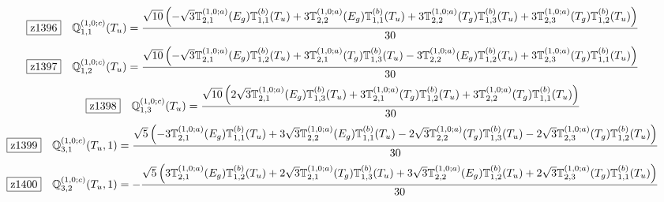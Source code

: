 \documentclass[fleqn,10pt,landscape]{jsarticle}
\begin{document}
\begin{dmath*}
\hspace*{3mm}\fbox{z1396}\quad \mathbb{Q}_{1,1}^{(1,0;c)}(T_{u})=\frac{\sqrt{10} \left(- \sqrt{3} \mathbb{T}_{2,1}^{(1,0;a)}(E_{g}) \mathbb{T}_{1,1}^{(b)}(T_{u}) + 3 \mathbb{T}_{2,2}^{(1,0;a)}(E_{g}) \mathbb{T}_{1,1}^{(b)}(T_{u}) + 3 \mathbb{T}_{2,2}^{(1,0;a)}(T_{g}) \mathbb{T}_{1,3}^{(b)}(T_{u}) + 3 \mathbb{T}_{2,3}^{(1,0;a)}(T_{g}) \mathbb{T}_{1,2}^{(b)}(T_{u})\right)}{30}
\end{dmath*}
\begin{dmath*}
\hspace*{3mm}\fbox{z1397}\quad \mathbb{Q}_{1,2}^{(1,0;c)}(T_{u})=\frac{\sqrt{10} \left(- \sqrt{3} \mathbb{T}_{2,1}^{(1,0;a)}(E_{g}) \mathbb{T}_{1,2}^{(b)}(T_{u}) + 3 \mathbb{T}_{2,1}^{(1,0;a)}(T_{g}) \mathbb{T}_{1,3}^{(b)}(T_{u}) - 3 \mathbb{T}_{2,2}^{(1,0;a)}(E_{g}) \mathbb{T}_{1,2}^{(b)}(T_{u}) + 3 \mathbb{T}_{2,3}^{(1,0;a)}(T_{g}) \mathbb{T}_{1,1}^{(b)}(T_{u})\right)}{30}
\end{dmath*}
\begin{dmath*}
\hspace*{3mm}\fbox{z1398}\quad \mathbb{Q}_{1,3}^{(1,0;c)}(T_{u})=\frac{\sqrt{10} \left(2 \sqrt{3} \mathbb{T}_{2,1}^{(1,0;a)}(E_{g}) \mathbb{T}_{1,3}^{(b)}(T_{u}) + 3 \mathbb{T}_{2,1}^{(1,0;a)}(T_{g}) \mathbb{T}_{1,2}^{(b)}(T_{u}) + 3 \mathbb{T}_{2,2}^{(1,0;a)}(T_{g}) \mathbb{T}_{1,1}^{(b)}(T_{u})\right)}{30}
\end{dmath*}
\begin{dmath*}
\hspace*{3mm}\fbox{z1399}\quad \mathbb{Q}_{3,1}^{(1,0;c)}(T_{u},1)=\frac{\sqrt{5} \left(- 3 \mathbb{T}_{2,1}^{(1,0;a)}(E_{g}) \mathbb{T}_{1,1}^{(b)}(T_{u}) + 3 \sqrt{3} \mathbb{T}_{2,2}^{(1,0;a)}(E_{g}) \mathbb{T}_{1,1}^{(b)}(T_{u}) - 2 \sqrt{3} \mathbb{T}_{2,2}^{(1,0;a)}(T_{g}) \mathbb{T}_{1,3}^{(b)}(T_{u}) - 2 \sqrt{3} \mathbb{T}_{2,3}^{(1,0;a)}(T_{g}) \mathbb{T}_{1,2}^{(b)}(T_{u})\right)}{30}
\end{dmath*}
\begin{dmath*}
\hspace*{3mm}\fbox{z1400}\quad \mathbb{Q}_{3,2}^{(1,0;c)}(T_{u},1)=- \frac{\sqrt{5} \left(3 \mathbb{T}_{2,1}^{(1,0;a)}(E_{g}) \mathbb{T}_{1,2}^{(b)}(T_{u}) + 2 \sqrt{3} \mathbb{T}_{2,1}^{(1,0;a)}(T_{g}) \mathbb{T}_{1,3}^{(b)}(T_{u}) + 3 \sqrt{3} \mathbb{T}_{2,2}^{(1,0;a)}(E_{g}) \mathbb{T}_{1,2}^{(b)}(T_{u}) + 2 \sqrt{3} \mathbb{T}_{2,3}^{(1,0;a)}(T_{g}) \mathbb{T}_{1,1}^{(b)}(T_{u})\right)}{30}
\end{dmath*}
\end{document}

